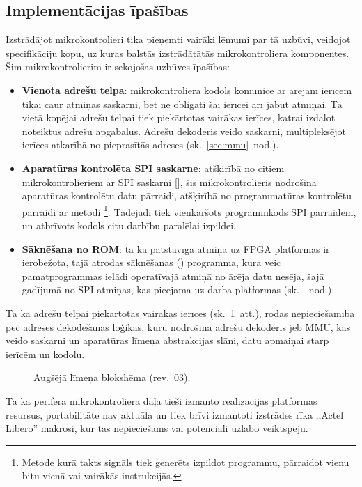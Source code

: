 \subsection{Implementācijas īpašības} \label{sec:design}
Izstrādājot mikrokontrolieri tika pieņemti vairāki lēmumi par tā uzbūvi,
veidojot specifikāciju kopu, uz kuras
balstās izstrādātātās mikrokontroliera komponentes.
Šim mikrokontrolierim ir sekojošas uzbūves īpašības:
\begin{itemize}
	\item \textbf{Vienota adrešu telpa}:
		mikrokontroliera kodols komunicē ar ārējām ierīcēm tikai caur
		atmiņas saskarni, bet ne obligāti šai ierīcei arī jābūt atmiņai.
		Tā vietā kopējai adrešu telpai tiek piekārtotas vairākas ierīces,
		katrai izdalot noteiktus adrešu apgabalus. Adrešu dekoderis veido saskarni,
		multipleksējot ierīces atkarībā no pieprasītās adreses
		(sk.~\ref{sec:mmu}~nod.).\pagebreak[1]
	\item \textbf{Aparatūras kontrolēta SPI saskarne}:
		atšķirībā no citiem mikrokontrolieriem ar SPI saskarni
		[\todo ], %
		šis mikro\-kontrolieris nodrošina aparatūras kontrolētu datu pārraidi,
		atšķirībā no programmatūras kontrolētu pārraidi ar
		 metodi%
		\footnote{Metode kurā takts signāls tiek ģenerēts izpildot programmu,
			pārraidot vienu bitu vienā vai vairākās instrukcijās.}.
		Tādējādi tiek vienkāršots programmkods SPI pārraidēm, un atbrīvots
		kodols citu darbību paralēlai izpildei.
	\item \textbf{Sāknēšana no ROM}:
		tā kā patstāvīgā atmiņa uz FPGA platformas ir ierobežota, tajā
		atrodas sāknēšanas () programma,
		kura veic pamatprogrammas ielādi
		operatīvajā atmiņā no ārēja datu nesēja, šajā gadījumā no 
		SPI  atmiņas, kas pieejama uz darba platformas
		(sk.~\todo{}~nod.).
\end{itemize}

Tā kā adrešu telpai piekārtotas vairākas ierīces (sk.~\ref{fig:top-rev3}~att.),
rodas nepieciešamība pēc adreses dekodēšanas loģikas, kuru nodrošina
adrešu dekoderis jeb MMU, kas veido saskarni un 
aparatūras līmeņa abstrakcijas slāni, datu apmaiņai starp ierīcēm un kodolu.

\begin{figure}[tbhp]
	\centering
	\def\svgwidth{\textwidth}
	{}
	\caption{Augšējā līmeņa blokshēma (rev.~03).}
	\label{fig:top-rev3}
\end{figure}

Tā kā perifērā mikrokontroliera daļa tieši izmanto realizācijas
platformas resursus, portabilitāte nav aktuāla un tiek brīvi izmantoti izstrādes rīka 
,,Actel Libero'' makrosi, kur tas nepieciešams vai potenciāli uzlabo
veiktspēju.
\FloatBarrier %
